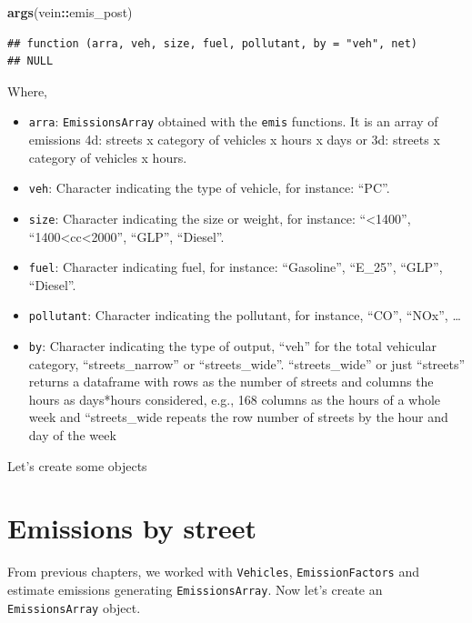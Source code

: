 \documentclass[12pt,graybox,envcountchap,sectrefs]{krantz}
\makeatletter
\newenvironment{Shaded}{\begin{snugshade}}{\end{snugshade}}
\newcommand{\KeywordTok}[1]{\textcolor[rgb]{0.13,0.29,0.53}{\textbf{#1}}}
\newcommand{\OperatorTok}[1]{\textcolor[rgb]{0.81,0.36,0.00}{\textbf{#1}}}
\newcommand{\NormalTok}[1]{#1}
\providecommand{\tightlist}{%
  \setlength{\itemsep}{0pt}\setlength{\parskip}{0pt}}
\newenvironment{kframe}{%
\medskip{}
\setlength{\fboxsep}{.8em}
 \def\at@end@of@kframe{}%
 \ifinner\ifhmode%
  \def\at@end@of@kframe{\end{minipage}}%
  \begin{minipage}{\columnwidth}%
 \fi\fi%
 \def\FrameCommand##1{\hskip\@totalleftmargin \hskip-\fboxsep
 \colorbox{shadecolor}{##1}\hskip-\fboxsep
     \hskip-\linewidth \hskip-\@totalleftmargin \hskip\columnwidth}%
 \MakeFramed {\advance\hsize-\width
   \@totalleftmargin\z@ \linewidth\hsize
   \@setminipage}}%
 {\par\unskip\endMakeFramed%
 \at@end@of@kframe}
\renewenvironment{Shaded}{\begin{kframe}}{\end{kframe}}
\theoremstyle{definition}
\theoremstyle{definition}
\theoremstyle{definition}
\theoremstyle{remark}
\makeatother
\begin{document}
\begin{Shaded}
\begin{Highlighting}[]
\KeywordTok{args}\NormalTok{(vein}\OperatorTok{::}\NormalTok{emis_post)}
\end{Highlighting}
\end{Shaded}

\begin{verbatim}
## function (arra, veh, size, fuel, pollutant, by = "veh", net) 
## NULL
\end{verbatim}

Where,

\begin{itemize}
\tightlist
\item
  \texttt{arra}: \texttt{EmissionsArray} obtained with the \texttt{emis}
  functions. It is an array of emissions 4d: streets x category of
  vehicles x hours x days or 3d: streets x category of vehicles x hours.
\item
  \texttt{veh}: Character indicating the type of vehicle, for instance:
  ``PC''.
\item
  \texttt{size}: Character indicating the size or weight, for instance:
  ``\textless{}1400'', ``1400\textless{}cc\textless{}2000'', ``GLP'',
  ``Diesel''.
\item
  \texttt{fuel}: Character indicating fuel, for instance: ``Gasoline'',
  ``E\_25'', ``GLP'', ``Diesel''.
\item
  \texttt{pollutant}: Character indicating the pollutant, for instance,
  ``CO'', ``NOx'', \ldots{}
\item
  \texttt{by}: Character indicating the type of output, ``veh'' for the
  total vehicular category, ``streets\_narrow'' or ``streets\_wide''.
  ``streets\_wide'' or just ``streets'' returns a dataframe with rows as
  the number of streets and columns the hours as days*hours considered,
  e.g., 168 columns as the hours of a whole week and ``streets\_wide
  repeats the row number of streets by the hour and day of the week
\end{itemize}

Let's create some objects

\section{Emissions by street}\label{emissions-by-street}

From previous chapters, we worked with \texttt{Vehicles},
\texttt{EmissionFactors} and estimate emissions generating
\texttt{EmissionsArray}. Now let's create an \texttt{EmissionsArray}
object.
\end{document}
